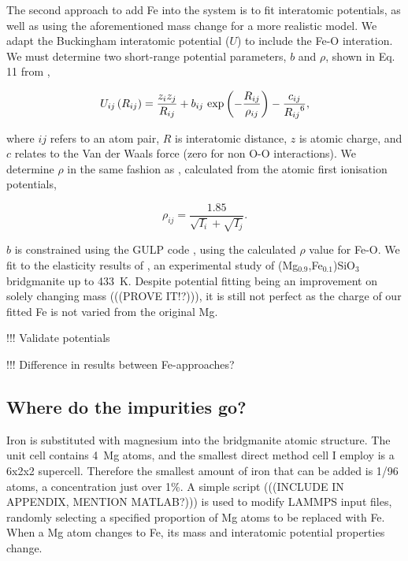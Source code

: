 The second approach to add Fe into the \mgsios system is to fit interatomic potentials, as well as using the aforementioned mass change for a more realistic model. We adapt the \citet{Oganov2000} \mgsios Buckingham interatomic potential ($U$) to include the Fe-O interation. We must determine two short-range potential parameters, $b$ and $\rho$, shown in Eq. 11 from \citet{Oganov2000},

\begin{equation}
U_{ij}\left ( R_{ij} \right ) = \frac{z_{i}z_{j}}{R_{ij}} + b_{ij}\ \textup{exp}\left ( - \frac{R_{ij}}{\rho_{ij}} \right ) - \frac{c_{ij}}{{R_{ij}}^{6}}, \label{og_buck}
\end{equation}

where $ij$ refers to an atom pair, $R$ is interatomic distance, $z$ is atomic charge, and $c$ relates to the Van der Waals force (zero for non O-O interactions). We determine $\rho$ in the same fashion as \citet{Oganov2000}, calculated from the atomic first ionisation potentials,

\begin{equation}
\rho_{ij} = \frac{1.85}{\sqrt{I_{i}}+\sqrt{I_{j}}}.  \label{urusov}
\end{equation}

$b$ is constrained using the GULP code \citep{Gale1997}, using the calculated $\rho$ value for Fe-O. We fit to the elasticity results of \citet{Parise1990}, an experimental study of (Mg$_{0.9}$,Fe$_{0.1}$)SiO$_3$ bridgmanite up to 433~K. Despite potential fitting being an improvement on solely changing mass (((PROVE IT!?))), it is still not perfect as the charge of our fitted Fe is not varied from the original Mg.

!!! Validate potentials

!!! Difference in results between Fe-approaches?



\subsection{Where do the impurities go?} 

Iron is substituted with magnesium into the bridgmanite atomic structure. The unit cell contains 4~Mg atoms, and the smallest direct method cell I employ is a 6x2x2 supercell. Therefore the smallest amount of iron that can be added is 1/96 atoms, a concentration just over 1\%. A simple script (((INCLUDE IN APPENDIX, MENTION MATLAB?))) is used to modify LAMMPS input files, randomly selecting a specified proportion of Mg atoms to be replaced with Fe. When a Mg atom changes to Fe, its mass and interatomic potential properties change. 

